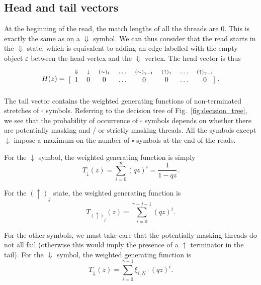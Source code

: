 \documentclass{article}
\newcommand{\DN}{\scriptstyle{\Downarrow}}
\newcommand{\dn}{\scriptstyle{\downarrow}}
\newcommand{\up}[1]{\scriptstyle{(\uparrow)_{#1}}}
\newcommand{\eq}[1]{\scriptstyle{(\sim)_{#1}}}
\begin{document}
\subsection{Head and tail vectors}

At the beginning of the read, the match lengths of all the threads are
$0$. This is exactly the same as on a $\Downarrow$ symbol. We can thus
consider that the read starts in the $\Downarrow$ state, which is
equivalent to adding an edge labelled with the empty object $\varepsilon$
between the head vertex and the $\Downarrow$ vertex. The head vector is
thus
\begin{equation*}
H(z) = 
\begin{blockarray}{cccccccc}
   \;\; \DN & \dn &\eq{1} & \ldots & \eq{\gamma-1} &
    \up{1} & \ldots & \up{\gamma-1} \\
\begin{block}{[cccccccc]}
\;\; 1 & 0 & 0 & \ldots & 0 & 0 & \ldots & 0 \\
\end{block}
\end{blockarray}.
\end{equation*}
The tail vector contains the weighted generating functions of
non-terminated stretches of $\square$ symbols. Referring to the decision
tree of Fig.~\ref{fig:decision_tree}, we see that the probability of
occurrence of $\square$ symbols depends on whether there are potentially
masking and / or strictly masking threads. All the symbols except
$\downarrow$ impose a maximum on the number of $\square$ symbols at the
end of the reads.

For the $\downarrow$ symbol, the weighted generating function is simply
\begin{equation}
T_{\downarrow}(z) = \sum_{i=0}^\infty (qz)^i = \frac{1}{1-qz}.
\end{equation}

For the $(\uparrow)_j$ state, the weighted generating function is
\begin{equation}
T_{(\uparrow)_j}(z) = \sum_{i=0}^{\gamma-j-1} (qz)^i.
\end{equation}

For the other symbols, we must take care that the potentially masking
threads do not all fail (otherwise this would imply the presence of a
$\uparrow$ terminator in the tail). For the $\Downarrow$ symbol, the
weighted generating function is
\begin{equation}
T_{\Downarrow}(z) = \sum_{i=0}^{\gamma-1} \xi_{i,N} \cdot (qz)^i.
\end{equation}
\end{document}
